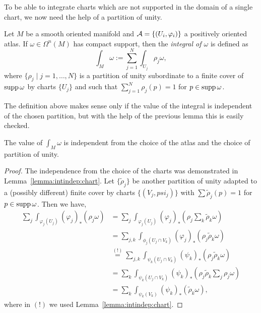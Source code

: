 To be able to integrate charts which are not supported in the domain of a single chart, we now need the help of a partition of unity.

\begin{definition}
  Let $M$ be a smooth oriented manifold and $\mathcal{A} = \{(U_i,\varphi_i)\}$ a positively oriented atlas.
  If $\omega \in \Omega^n(M)$ has compact support, then the \emph{integral of $\omega$} is defined as
  \begin{equation}\label{eq:intnform}
    \int_M \omega := \sum_{j=1}^N \int_{U_j}\rho_j\omega,
  \end{equation}
  where $\{\rho_j\mid j=1,\ldots, N\}$ is a partition of unity subordinate to a finite cover of $\operatorname{supp} \omega$ by charts $\{U_j\}$ and such that $\sum_{j=1}^N \rho_j(p) = 1$ for $p\in\operatorname{supp}\omega$.
\end{definition}

The definition above makes sense only if the value of the integral is independent of the chosen partition, but with the help of the previous lemma this is easily checked.

\begin{lemma}\label{lemma:intinman}
  The value of $\int_M\omega$ is independent from the choice of the atlas and the choice of partition of unity.
\end{lemma}
\begin{proof}
  The independence from the choice of the charts was demonstrated in Lemma~\ref{lemma:intindep:chart}.
  Let $\{\widetilde\rho_j\}$ be another partition of unity adapted to a (possibly different) finite cover by charts $\{(V_j, psi_j)\}$ with $\sum \widetilde\rho_j(p) = 1$ for $p\in\operatorname{supp}\omega$.
  Then we have,
  \begin{align}
    \sum_j \int_{\varphi_j(U_j)} (\varphi_j)_*\left(\rho_j \omega\right)
    &= \sum_j \int_{\varphi_j(U_j)} (\varphi_j)_*\left(\rho_j \sum_k \widetilde\rho_k\omega\right) \\
    &= \sum_{j,k} \int_{\phi_j(U_j\cap V_k)} (\varphi_j)_* \left(\rho_j \widetilde\rho_k\omega\right) \\
    &\overset{(!)}{=} \sum_{j,k} \int_{\psi_k(U_j\cap V_k)} (\psi_k)_* \left(\rho_j \widetilde\rho_k\omega\right) \\
    &= \sum_k \int_{\psi_k(U_j\cap V_k)} (\psi_k)_*\left(\rho_j \widetilde\rho_k \sum_j\rho_j \omega\right) \\
    &= \sum_k \int_{\psi_k(V_k)} (\psi_k)_*\left( \widetilde\rho_k \omega\right),
  \end{align}
  where in $(!)$ we used Lemma~\ref{lemma:intindep:chart}.
\end{proof}

